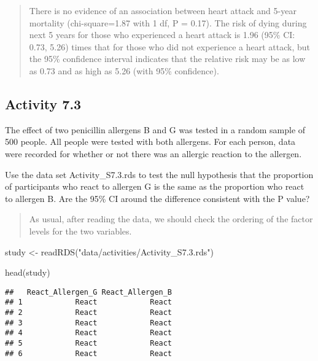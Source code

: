 \documentclass[
]{memoir}
\newenvironment{Shaded}{\begin{snugshade}}{\end{snugshade}}
\newcommand{\FunctionTok}[1]{\textcolor[rgb]{0.00,0.00,0.00}{#1}}
\newcommand{\NormalTok}[1]{#1}
\newcommand{\OtherTok}[1]{\textcolor[rgb]{0.56,0.35,0.01}{#1}}
\newcommand{\StringTok}[1]{\textcolor[rgb]{0.31,0.60,0.02}{#1}}
\begin{document}
\begin{quote}
There is no evidence of an association between heart attack and 5-year mortality (chi-square=1.87 with 1 df, P = 0.17). The risk of dying during next 5 years for those who experienced a heart attack is 1.96 (95\% CI: 0.73, 5.26) times that for those who did not experience a heart attack, but the 95\% confidence interval indicates that the relative risk may be as low as 0.73 and as high as 5.26 (with 95\% confidence).
\end{quote}

\hypertarget{activity-7.3}{%
\subsection*{Activity 7.3}\label{activity-7.3}}

The effect of two penicillin allergens B and G was tested in a random sample of 500 people. All people were tested with both allergens. For each person, data were recorded for whether or not there was an allergic reaction to the allergen.

Use the data set Activity\_S7.3.rds to test the null hypothesis that the proportion of participants who react to allergen G is the same as the proportion who react to allergen B. Are the 95\% CI around the difference consistent with the P value?

\begin{quote}
As usual, after reading the data, we should check the ordering of the factor levels for the two variables.
\end{quote}

\begin{Shaded}
\begin{Highlighting}[]
\NormalTok{study }\OtherTok{\textless{}{-}} \FunctionTok{readRDS}\NormalTok{(}\StringTok{"data/activities/Activity\_S7.3.rds"}\NormalTok{)}

\FunctionTok{head}\NormalTok{(study)}
\end{Highlighting}
\end{Shaded}

\begin{verbatim}
##   React_Allergen_G React_Allergen_B
## 1            React            React
## 2            React            React
## 3            React            React
## 4            React            React
## 5            React            React
## 6            React            React
\end{verbatim}
\end{document}
